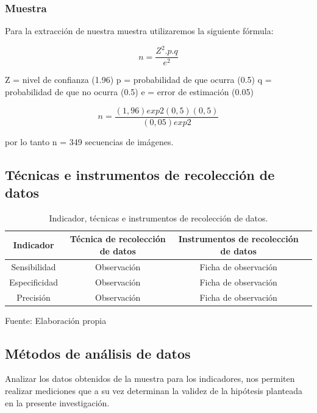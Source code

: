 \subsubsection{Muestra}
Para la extracción de nuestra muestra utilizaremos la siguiente fórmula:

\begin{equation}
 n = \frac{Z^{2}.p.q}{e^{2}}
\end{equation}

\vskip 1cm

Z = nivel de confianza (1.96) \vskip 0.1cm
p = probabilidad de que ocurra (0.5) \vskip 0.1cm
q = probabilidad de que no ocurra (0.5) \vskip 0.1cm
e = error de estimación (0.05) 

\begin{equation}
 n = \frac{(1,96)exp2(0,5)(0,5)}{(0,05)exp2}
\end{equation}

\vskip 0.5cm

por lo tanto n = 349 secuencias de imágenes.

\vskip 4.5cm

\subsection{Técnicas e instrumentos de recolección de datos}

\begin{table}[ht!]
\centering
\caption{Indicador, técnicas e instrumentos de recolección de datos.} \vskip 0.1cm
\begin{tabular}{|c|c|c|c|}  \hline 
\bf Indicador & \bf Técnica de recolección de datos & \bf Instrumentos de recolección de datos \\ \hline 
Sensibilidad & Observación & Ficha de observación \\ \hline
Especificidad & Observación & Ficha de observación \\ \hline 
Precisión & Observación & Ficha de observación \\ \hline
\end{tabular}
\begin{center}
{\small{Fuente: Elaboración propia}}
\end{center}
\end{table}

\subsection{Métodos de análisis de datos}
Analizar los datos obtenidos de la muestra para los indicadores, nos permiten realizar mediciones que a su vez determinan la validez de la hipótesis planteada en la presente investigación. 

